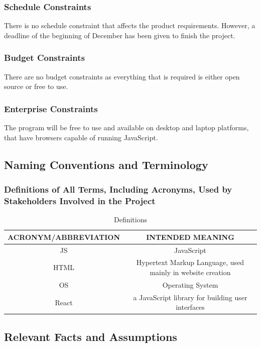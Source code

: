 \documentclass[11pt, oneside]{article}
\begin{document}
\subsubsection{Schedule Constraints}
There is no schedule constraint that affects the product requirements. However, a deadline of the beginning of December has been given to finish the project.


\subsubsection{Budget Constraints}
There are no budget constraints as everything that is required is either open source or free to use.


\subsubsection{Enterprise Constraints}
The program will be free to use and available on desktop and laptop platforms, that have browsers capable of running JavaScript.


\subsection{Naming Conventions and Terminology}
\subsubsection{Definitions of All Terms, Including Acronyms, Used by Stakeholders Involved in the Project}

\begin{table}[H]
\caption{Definitions}
\begin{center}
\begin{tabular}{|c|c|}
\hline
\hline
ACRONYM/ABBREVIATION & INTENDED MEANING\\
\hline
JS & JavaScript\\
\hline
HTML &Hypertext Markup Language, used mainly in website creation\\
\hline
OS & Operating System\\
\hline
React & a JavaScript library for building user interfaces\\
\hline
\end{tabular}
\end{center}
\label{default}
\end{table}%



\subsection{Relevant Facts and Assumptions}
\end{document}
